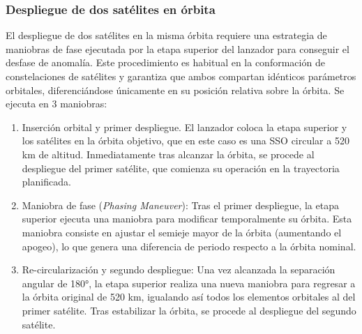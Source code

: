 \subsubsection{Despliegue de dos satélites en órbita}

El despliegue de dos satélites en la misma órbita requiere una estrategia de maniobras de fase ejecutada por la etapa superior del lanzador para conseguir el desfase de anomalía. Este procedimiento es habitual en la conformación de constelaciones de satélites y garantiza que ambos compartan idénticos parámetros orbitales, diferenciándose únicamente en su posición relativa sobre la órbita. Se ejecuta en 3 maniobras: 
\begin{enumerate}
    \item Inserción orbital y primer despliegue. El lanzador coloca la etapa superior y los satélites en la órbita objetivo, que en este caso es una SSO circular a 520 km de altitud. Inmediatamente tras alcanzar la órbita, se procede al despliegue del primer satélite, que comienza su operación en la trayectoria planificada.

    \item Maniobra de fase (\textit{Phasing Maneuver}): Tras el primer despliegue, la etapa superior ejecuta una maniobra para modificar temporalmente su órbita. Esta maniobra consiste en ajustar el semieje mayor de la órbita (aumentando el apogeo), lo que genera una diferencia de periodo respecto a la órbita nominal. 

    \item Re-circularización y segundo despliegue: Una vez alcanzada la separación angular de 180°, la etapa superior realiza una nueva maniobra para regresar a la órbita original de 520 km, igualando así todos los elementos orbitales al del primer satélite. Tras estabilizar la órbita, se procede al despliegue del segundo satélite.
\end{enumerate}

